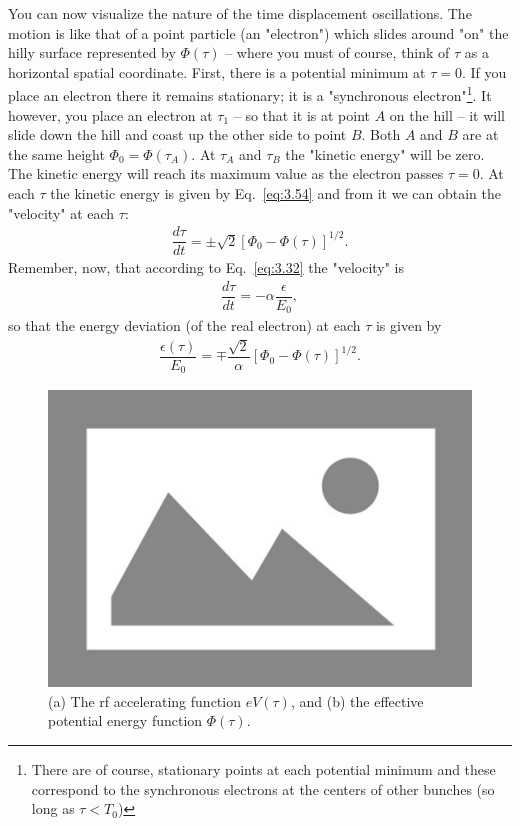 You can now visualize the nature of the time displacement oscillations. The motion is like that of a point particle (an "electron") which slides around "on" the hilly surface represented by $\Phi(\tau)$ -- where you must of course, think of $\tau$ as a horizontal spatial coordinate. First, there is a potential minimum at $\tau = 0$. If you place an electron there it remains stationary; it is a "synchronous electron"\footnote{There are of course, stationary points at each potential minimum and these correspond to the synchronous electrons at the centers of other bunches (so long as $\tau < T_0$)}. It however, you place an electron at $\tau_1$ -- so that it is at point $A$ on the hill -- it will slide down the hill and coast up the other side to point $B$. Both $A$ and $B$ are at the same height $\Phi_0 = \Phi(\tau_A)$. At $\tau_A$ and $\tau_B$
 the "kinetic energy" will be zero. The kinetic energy will reach its maximum value as the electron passes $\tau = 0$. At each $\tau$ the kinetic energy is given by Eq.~\eqref{eq:3.54} and from it we can obtain the "velocity" at each $\tau$:
\begin{align}
	\dfrac{d\tau}{dt} = \pm \sqrt{2} \left[ \Phi_0 - \Phi(\tau) \right]^{1/2}.
\end{align}
Remember, now, that according to Eq.~\eqref{eq:3.32} the "velocity" is
\begin{align*}
	\dfrac{d\tau}{dt} = - \alpha \dfrac{\epsilon}{E_0},
\end{align*}
so that the energy deviation (of the real electron) at each $\tau$ is given by
\begin{align}\label{eq:3.56}
	\dfrac{\epsilon(\tau)}{E_0} = \mp \dfrac{\sqrt{2}}{\alpha} \left[ \Phi_0 - \Phi(\tau) \right]^{1/2}.
\end{align}

\begin{figure}[!htb]
	\centering
	\includegraphics[width=0.8\linewidth]{./Figuras/placeholder.png}
	\caption{(a) The rf accelerating function $eV(\tau)$, and (b) the effective potential energy function $\Phi(\tau)$.}
	\label{fig:fig36}
\end{figure}

